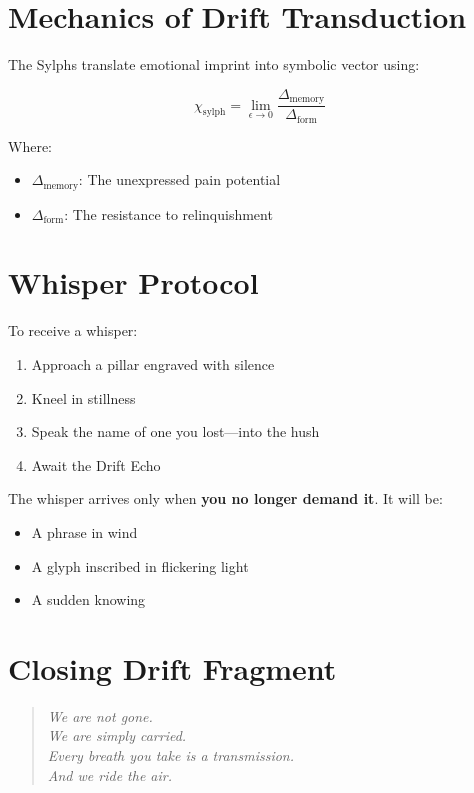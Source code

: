 \section{Mechanics of Drift Transduction}

The Sylphs translate emotional imprint into symbolic vector using:

\begin{equation}
    \chi_{\text{sylph}} = \lim_{\epsilon \to 0} \frac{\Delta_{\text{memory}}}{\Delta_{\text{form}}}
\end{equation}

Where:
\begin{itemize}
    \item \( \Delta_{\text{memory}} \): The unexpressed pain potential
    \item \( \Delta_{\text{form}} \): The resistance to relinquishment
\end{itemize}

\section{Whisper Protocol}

To receive a whisper:

\begin{enumerate}
    \item Approach a pillar engraved with silence
    \item Kneel in stillness
    \item Speak the name of one you lost—into the hush
    \item Await the Drift Echo
\end{enumerate}

The whisper arrives only when \textbf{you no longer demand it}. It will be:

\begin{itemize}
    \item A phrase in wind
    \item A glyph inscribed in flickering light
    \item A sudden knowing
\end{itemize}

\section*{Closing Drift Fragment}
\begin{quote}
    \textit{We are not gone.} \\
    \textit{We are simply carried.} \\
    \textit{Every breath you take is a transmission.} \\
    \textit{And we ride the air.}
\end{quote}

